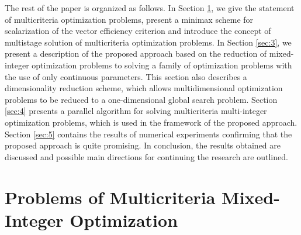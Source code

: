 \documentclass{svproc}
\begin{document}
The rest of the paper is organized as follows. In Section \ref{sec:2}, we give the statement of multicriteria optimization problems, present a minimax scheme for scalarization of the vector efficiency criterion and introduce the concept of multistage solution of multicriteria optimization problems. In Section \ref{sec:3}, we present a description of the proposed approach based on the reduction of mixed-integer optimization problems to solving a family of optimization problems with the use of only continuous parameters. This section also describes a dimensionality reduction scheme, which allows multidimensional optimization problems to be reduced to a one-dimensional global search problem. Section \ref{sec:4} presents a parallel algorithm for solving multicriteria multi-integer optimization problems, which is used in the framework of the proposed approach. Section \ref{sec:5} contains the results of numerical experiments confirming that the proposed approach is quite promising. In conclusion, the results obtained are discussed and possible main directions for continuing the research are outlined.


\section{Problems of Multicriteria Mixed-Integer Optimization}\label{sec:2}
\end{document}
